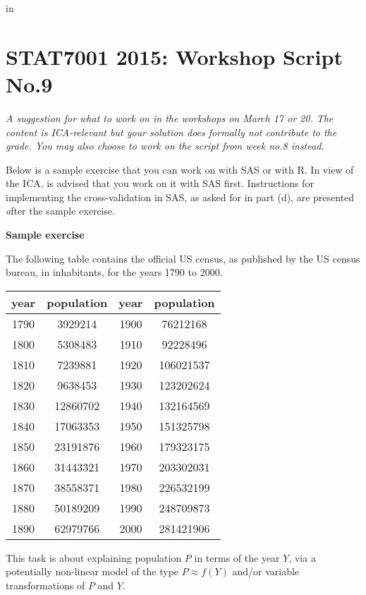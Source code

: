 
\topmargin   -3cm
\textwidth   6.2in
 in



\section*{STAT7001 2015: Workshop Script No.9}
{\em A suggestion for what to work on in the workshops on March 17 or 20. The content is ICA-relevant but your solution does formally not contribute to the grade. You may also choose to work on the script from week no.8 instead.}

Below is a sample exercise that you can work on with SAS or with R. In view of the ICA, is advised that you work on it with SAS first. Instructions for implementing the cross-validation in SAS, as asked for in part (d), are presented {\emph after} the sample exercise.

{\bf Sample exercise}

The following table contains the official US census, as published by the US census bureau, in inhabitants, for the years 1790 to 2000.
\begin{center}
\begin{tabular}{|c|c||c|c|}
  \hline
  year & population & year & population\\\hline
  1790 & 3929214 & 1900 & 76212168\\
  1800 & 5308483 & 1910 & 92228496\\
  1810 & 7239881 & 1920 & 106021537\\
  1820 & 9638453 & 1930 & 123202624\\
  1830 & 12860702 & 1940 & 132164569\\
  1840 & 17063353 & 1950 & 151325798\\
  1850 & 23191876 & 1960 & 179323175\\
  1860 & 31443321 & 1970 & 203302031\\
  1870 & 38558371 & 1980 & 226532199\\
  1880 & 50189209 & 1990 & 248709873\\
  1890 & 62979766 & 2000 & 281421906\\  \hline
\end{tabular}\newline
\end{center}

This task is about explaining population $P$ in terms of the year $Y$, via a potentially non-linear model of the type $P\approx f(Y)$ and/or variable transformations of $P$ and $Y$.

